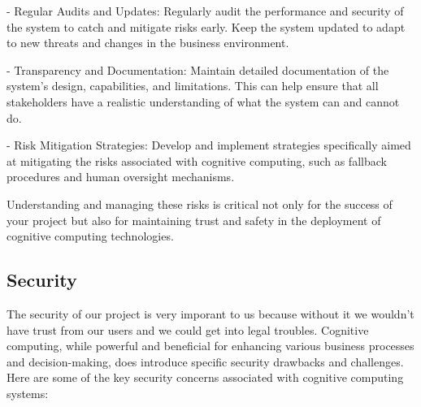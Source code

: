 \documentclass{article}
\begin{document}
  - Regular Audits and Updates: Regularly audit the performance and security of the system to catch and mitigate risks early. Keep the system updated to adapt to new threats and changes in the business environment.

  - Transparency and Documentation: Maintain detailed documentation of the system's design, capabilities, and limitations. This can help ensure that all stakeholders have a realistic understanding of what the system can and cannot do.

  - Risk Mitigation Strategies: Develop and implement strategies specifically aimed at mitigating the risks associated with cognitive computing, such as fallback procedures and human oversight mechanisms.

  Understanding and managing these risks is critical not only for the success of your project but also for maintaining trust and safety in the deployment of cognitive computing technologies.

\subsection{Security}

The security of our project is very imporant to us because without it we wouldn't have  trust from our users and we could get into legal troubles.
Cognitive computing, while powerful and beneficial for enhancing various business processes and decision-making, does introduce specific security drawbacks and challenges. Here are some of the key security concerns associated with cognitive computing systems:
\end{document}
